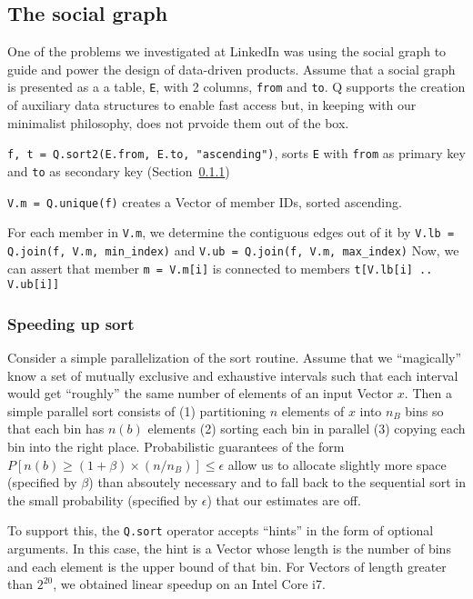 \subsection{The social graph}
\label{social_graph}

One of the problems we investigated at LinkedIn was using the social graph to
guide and power the design of data-driven products.
Assume that a social graph is presented as a 
a table, {\tt E}, with 2 columns, {\tt from} and {\tt to}. Q supports the
creation of auxiliary data structures to enable fast access but, in keeping with
our minimalist philosophy, does not prvoide them out of the box.
\be
\item {\tt f, t = Q.sort2(E.from, E.to, "ascending")}, sorts {\tt E}
with {\tt from} as primary key and {\tt to} as
secondary key (Section~\ref{par_sort})
\item {\tt V.m = Q.unique(f)} creates a Vector of 
member IDs, sorted ascending. 
\item For each member in {\tt V.m}, we determine the contiguous edges out of it by {\tt V.lb = Q.join(f, V.m, min\_index)}
and {\tt V.ub = Q.join(f, V.m, max\_index)}
Now, we can assert that member
{\tt m = V.m[i]} is connected to members {\tt t[V.lb[i] .. V.ub[i]]}
\ee


\subsubsection{Speeding up sort}
\label{par_sort}
Consider a simple parallelization of the sort routine. Assume that we 
``magically'' know a set of mutually exclusive and exhaustive intervals such
that each interval would get ``roughly'' the same number of elements of an input
Vector \(x\). Then a simple parallel sort consists of 
(1) partitioning \(n\) elements of \(x\) into \(n_B\) bins so that each bin has
\(n(b)\) elements
(2) sorting each bin in parallel
(3) copying each bin into the right place. Probabilistic guarantees
of the form \(P[n(b) \geq (1+\beta) \times(n/n_B)] \leq \epsilon\) 
allow us to allocate slightly more space (specified by \(\beta\)) than absoutely necessary and to 
fall back to the sequential sort in the small probability (specified by
\(\epsilon\))  that our estimates are off.

To support this, the {\tt Q.sort} operator accepts ``hints'' in the form of
optional arguments. In this case, the hint is a Vector whose length is the
number of bins and each element is the upper bound of that bin. For Vectors of
length greater than \(2^{20}\), we obtained linear speedup on an Intel Core i7.

